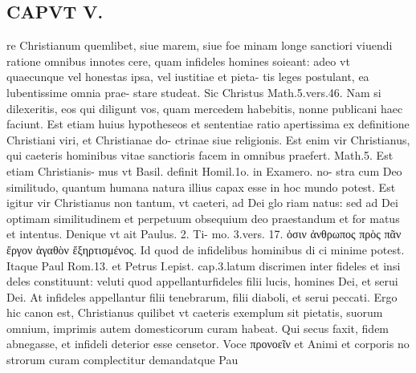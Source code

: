 \documentclass{article}
\begin{document}
\begin{pages}
\section*{CAPVT  V. }
\marginpar{[ p.265 ]}\pstart re Christianum quemlibet, siue marem, siue foe minam longe sanctiori viuendi ratione omnibus innotes cere, quam infideles homines soieant: adeo vt quaecunque vel honestas ipsa, vel iustitiae et pieta- tis leges postulant, ea lubentissime omnia prae- stare studeat. Sic Christus Math.5.vers.46. Nam si dilexeritis, eos qui diligunt vos, quam mercedem habebitis, nonne publicani haec faciunt. Est etiam huius hypotheseos et sententiae ratio apertissima ex definitione Christiani viri, et Christianae do- ctrinae siue religionis. Est enim vir Christianus, qui caeteris hominibus vitae sanctioris facem in omnibus praefert. Math.5. Est etiam Christianis- mus vt Basil. definit Homil.1o. in Examero. no- stra cum Deo similitudo, quantum humana natura illius capax esse in hoc mundo potest. Est igitur vir Christianus non tantum, vt caeteri, ad Dei glo riam natus: sed ad Dei optimam similitudinem et perpetuum obsequium deo praestandum et for matus et intentus. Denique vt ait Paulus. 2. Ti- mo. 3.vers. 17. ὁσιν ἀνθρωπος πρὸς πᾶν ἔργον ἀγαθὸν ἔξηρτισμένος. Id quod de infidelibus hominibus di ci minime potest. Itaque Paul Rom.13. et Petrus I.epist. cap.3.latum discrimen inter fideles et insi deles constituunt: veluti quod appellanturfideles filii lucis, homines Dei, et serui Dei. At infideles appellantur filii tenebrarum, filii diaboli, et serui peccati. Ergo hic canon est, Christianus quilibet vt caeteris exemplum sit pietatis, suorum omnium, imprimis autem domesticorum curam habeat. Qui secus faxit, fidem abnegasse, et infideli deterior esse censetor. Voce προνοεῖν et Animi et corporis no strorum curam complectitur demandatque Pau  \pend

\end{pages}
\end{document}
